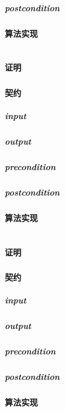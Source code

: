 \documentclass[a4paper]{book}
\numberwithin{equation}{chapter}
\theoremstyle{definition}
\begin{document}
\begin{multicols}{2}
\subparagraph{postcondition}

\paragraph{算法实现}
\begin{lstlisting}

\end{lstlisting}
\paragraph{证明}

\subsubsection{}
\paragraph{契约}
\subparagraph{input}

\subparagraph{output}

\subparagraph{precondition}

\subparagraph{postcondition}

\paragraph{算法实现}
\begin{lstlisting}

\end{lstlisting}
\paragraph{证明}

\subsubsection{}
\paragraph{契约}
\subparagraph{input}

\subparagraph{output}

\subparagraph{precondition}

\subparagraph{postcondition}

\paragraph{算法实现}
\begin{lstlisting}


\end{lstlisting}
\end{multicols}
\end{document}
